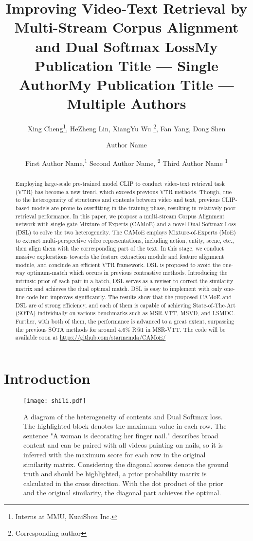\documentclass[letterpaper]{article} \usepackage{aaai22}  \usepackage{times}  \usepackage{helvet}  \usepackage{courier}  \usepackage[hyphens]{url}  \usepackage{graphicx} \urlstyle{rm} \def\UrlFont{\rm}  \usepackage{natbib}  \usepackage{caption}
\title{Improving Video-Text Retrieval by\\ Multi-Stream Corpus Alignment and Dual Softmax Loss}
\author{
Xing Cheng\thanks{Interns at MMU, KuaiShou Inc.}, HeZheng Lin\footnotemark[1], XiangYu Wu \thanks{Corresponding author}, Fan Yang, Dong Shen
    \\
}
\title{My Publication Title --- Single Author}
\author {
    Author Name
}
\title{My Publication Title --- Multiple Authors}
\author {
First Author Name,\textsuperscript{\rm 1}
    Second Author Name, \textsuperscript{\rm 2}
    Third Author Name \textsuperscript{\rm 1}
}
\begin{document}
\maketitle

\begin{abstract}
Employing large-scale pre-trained model CLIP to conduct video-text retrieval task (VTR) has become a new trend, which exceeds previous VTR methods. Though, due to the heterogeneity of structures and contents between video and text, previous CLIP-based models are prone to overfitting in the training phase, resulting in relatively poor retrieval performance. In this paper, we propose a multi-stream Corpus Alignment network with single gate Mixture-of-Experts (CAMoE) and a novel Dual Softmax Loss (DSL) to solve the two heterogeneity. The CAMoE employs Mixture-of-Experts (MoE) to extract multi-perspective video representations, including action, entity, scene, etc., then align them with the corresponding part of the text. In this stage, we conduct massive explorations towards the feature extraction module and feature alignment module, and conclude an efficient VTR framework. DSL is proposed to avoid the one-way optimum-match which occurs in previous contrastive methods. Introducing the intrinsic prior of each pair in a batch, DSL serves as a reviser to correct the similarity matrix and achieves the dual optimal match. DSL is easy to implement with only one-line code but improves significantly. The results show that the proposed CAMoE and DSL are of strong efficiency, and each of them is capable of achieving State-of-The-Art (SOTA) individually on various benchmarks such as MSR-VTT, MSVD, and LSMDC. Further, with both of them, the performance is advanced to a great extent, surpassing the 
previous SOTA methods for around 4.6\% R@1 in MSR-VTT. 
The code will be available soon at \url{https://github.com/starmemda/CAMoE/}
\end{abstract}


\section{Introduction}


\begin{figure*}[h]
\begin{center}
\texttt{[image: shili.pdf]}
\end{center}
\caption{A diagram of the heterogeneity of contents and Dual Softmax loss. The highlighted block denotes the maximum value in each row. The sentence "A woman is decorating her finger nail." describes broad content and can be paired with all videos painting on nails, so it is inferred with the maximum score for each row in the original similarity matrix. 
Considering the diagonal scores denote the ground truth and should be highlighted, a prior probability matrix is calculated in the cross direction. With the dot product of the prior and the original similarity, the diagonal part achieves the optimal.}
\label{confusion}
\end{figure*}
\end{document}
